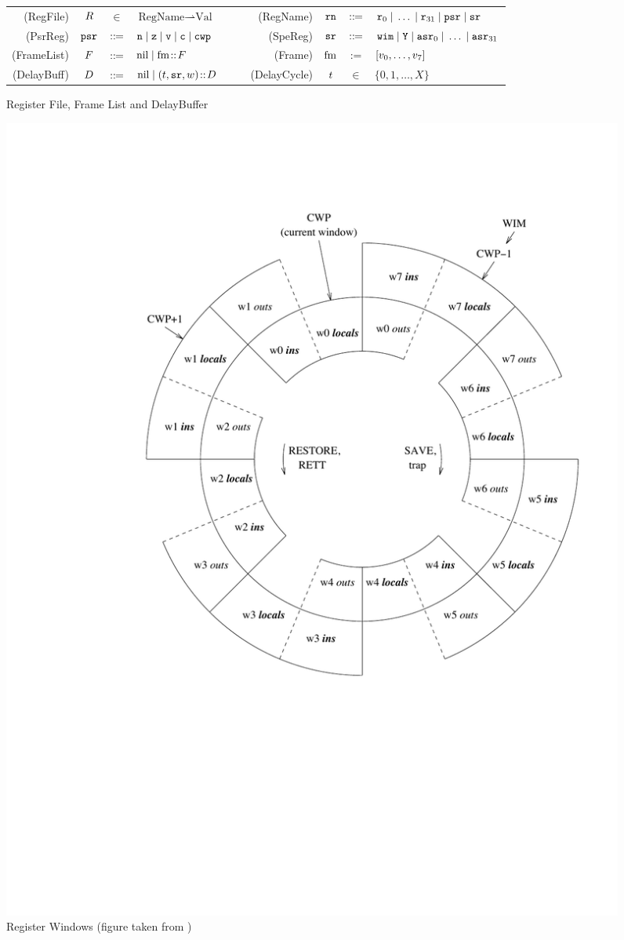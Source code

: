 \begin{figure}[!t]
	\small
	\begin{tabular}{rcclcrccl}
		(RegFile) & $R$ & $\in$ & $\text{RegName} \rightharpoonup 
			\text{Val}$

         & $\quad$ &
        (RegName) & $\texttt{rn}$ & $::\!\!{=}$ &
         $\texttt{r}_{0} \; | \; \dots \; | \; \texttt{r}_{31} \; | \; \texttt{psr} \; | \; \texttt{sr}$ \\
		
		(PsrReg) & $\texttt{psr}$ & $::\!\!{=}$ &
		$\texttt{n} \; | \;
			\texttt{z} \; | \;
			\texttt{v} \; | \;
			\texttt{c} \; | \; \texttt{cwp}$ & $\quad$ &
		(SpeReg) & $\texttt{sr}$ & $::\!\!{=}$ &
		$\texttt{wim} \; | \;
			\texttt{Y} \; | \;
\texttt{asr}_0 \; | \; \dots \; | \; \texttt{asr}_{31}$ \\
		
		(FrameList) & $F$ & $::\!\!{=}$ &
                            $\text{nil} \; | \; \text{fm} \!::\! F$ & $\quad$ &
		(Frame) & $\text{fm}$ & := & $[v_0, \dots, v_7]$ \\
		
		(DelayBuff) & $D$ & $::\!\!{=}$ & $\text{nil} \; | \;
                                  (t, \texttt{sr}, w) \!::\! D$
                                  & $\quad$
		& (DelayCycle) & $t$ & $\in$ & $\{ 0, 1, \dots, X \}$
	\end{tabular}
	\caption{Register File, Frame List and DelayBuffer}
	\label{fig:Register File and Frame List}
\end{figure}

\begin{figure}[!t]
	\centering
	\includegraphics[width=55ex]{window}
	\caption{Register Windows (figure taken from \cite{sparc})}
	\label{fig:RegisterWindows}
\end{figure}


